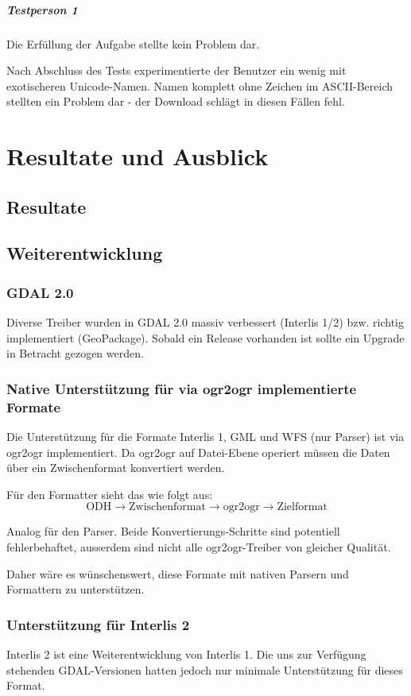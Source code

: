 \paragraph{Testperson 1}
Die Erfüllung der Aufgabe stellte kein Problem dar.

Nach Abschluss des Tests experimentierte der Benutzer ein wenig mit exotischeren Unicode-Namen. Namen komplett ohne Zeichen im ASCII-Bereich stellten ein Problem dar - der Download schlägt in diesen Fällen fehl. 
\chapter{Resultate und Ausblick}

\section{Resultate}

\section{Weiterentwicklung}

\subsection{GDAL 2.0}
Diverse Treiber wurden in GDAL 2.0 massiv verbessert (Interlis 1/2) bzw. richtig implementiert (GeoPackage). Sobald ein Release vorhanden ist sollte ein Upgrade in Betracht gezogen werden.

\subsection{Native Unterstützung für via ogr2ogr implementierte Formate}
Die Unterstützung für die Formate Interlis 1, GML und WFS (nur Parser) ist via ogr2ogr implementiert. Da ogr2ogr auf Datei-Ebene operiert müssen die Daten über ein Zwischenformat konvertiert werden.

Für den Formatter sieht das wie folgt aus:
$$ \text{ODH} \to \text{Zwischenformat} \to \text{ogr2ogr} \to \text{Zielformat} $$

Analog für den Parser. Beide Konvertierungs-Schritte sind potentiell fehlerbehaftet, ausserdem sind nicht alle ogr2ogr-Treiber von gleicher Qualität.

Daher wäre es wünschenswert, diese Formate mit nativen Parsern und Formattern zu unterstützen. 

\subsection{Unterstützung für Interlis 2}
Interlis 2 ist eine Weiterentwicklung von Interlis 1. Die uns zur Verfügung stehenden GDAL-Versionen hatten jedoch nur minimale Unterstützung für dieses Format.

